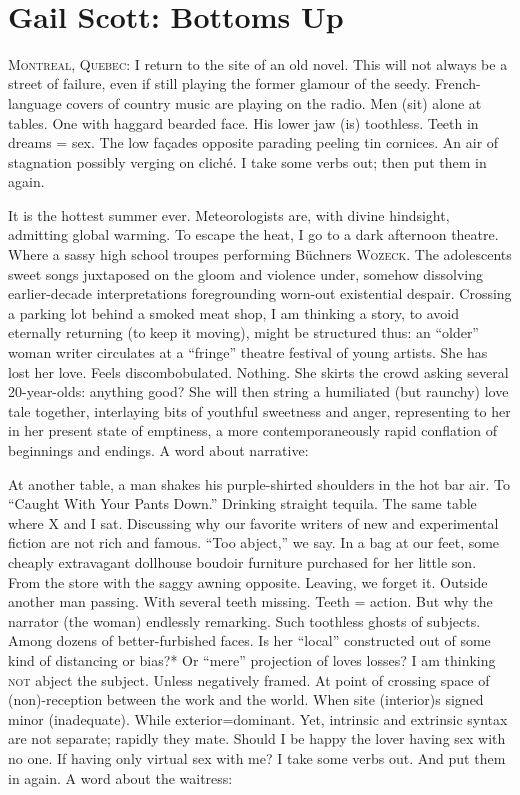 \documentclass[
]{memoir}
\begin{document}
~

\hypertarget{gail-scott-bottoms-up}{%
\chapter{Gail Scott: Bottoms Up}\label{gail-scott-bottoms-up}}

\lettrine[lines=3, findent=0em, nindent=0.1em, lhang=0]{M}{ontreal, Quebec}:
I return to the site of an old novel. This will not always be a street
of failure, even if still playing the former glamour of the seedy.
French-language covers of country music are playing on the radio. Men
(sit) alone at tables. One with haggard bearded face. His lower jaw (is)
toothless. Teeth in dreams = sex. The low façades opposite parading
peeling tin cornices. An air of stagnation possibly verging on cliché. I
take some verbs out; then put them in again.

It is the hottest summer ever. Meteorologists are, with divine
hindsight, admitting global warming. To escape the heat, I go to a dark
afternoon theatre. Where a sassy high school troupes performing Büchners
\textsc{Wozeck}. The adolescents sweet songs juxtaposed on the gloom and
violence under, somehow dissolving earlier-decade interpretations
foregrounding worn-out existential despair. Crossing a parking lot
behind a smoked meat shop, I am thinking a story, to avoid eternally
returning (to keep it moving), might be structured thus: an ``older''
woman writer circulates at a ``fringe'' theatre festival of young
artists. She has lost her love. Feels discombobulated. Nothing. She
skirts the crowd asking several 20-year-olds: anything good? She will
then string a humiliated (but raunchy) love tale together, interlaying
bits of youthful sweetness and anger, representing to her in her present
state of emptiness, a more contemporaneously rapid conflation of
beginnings and endings. A word about narrative:

At another table, a man shakes his purple-shirted shoulders in the hot
bar air. To ``Caught With Your Pants Down.'' Drinking straight tequila.
The same table where X and I sat. Discussing why our favorite writers of
new and experimental fiction are not rich and famous. ``Too abject,'' we
say. In a bag at our feet, some cheaply extravagant dollhouse boudoir
furniture purchased for her little son. From the store with the saggy
awning opposite. Leaving, we forget it. Outside another man passing.
With several teeth missing. Teeth = action. But why the narrator (the
woman) endlessly remarking. Such toothless ghosts of subjects. Among
dozens of better-furbished faces. Is her ``local'' constructed out of
some kind of distancing or bias?* Or ``mere'' projection of loves
losses? I am thinking \textsc{not} abject the subject. Unless negatively
framed. At point of crossing space of (non)-reception between the work
and the world. When site (interior)s signed minor (inadequate). While
exterior=dominant. Yet, intrinsic and extrinsic syntax are not separate;
rapidly they mate. Should I be happy the lover having sex with no one.
If having only virtual sex with me? I take some verbs out. And put them
in again. A word about the waitress:
\end{document}
